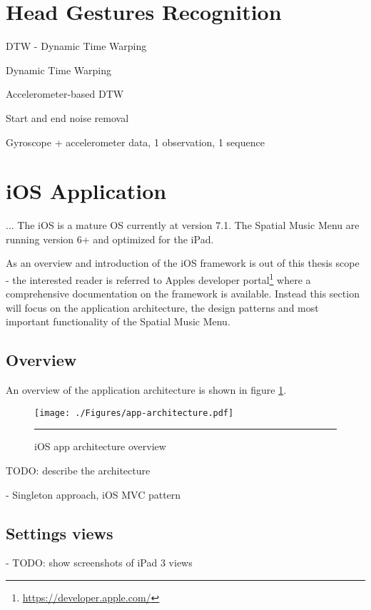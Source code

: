 \subsection{}


\section{Head Gestures Recognition}

DTW - Dynamic Time Warping 

Dynamic Time Warping \cite{salvador_toward_2007}

Accelerometer-based DTW \cite{akl_accelerometer-based_2010}

Start and end noise removal

Gyroscope + accelerometer data, 1 observation, 1 sequence


\section{iOS Application}
...
The iOS is a mature OS currently at version 7.1. The Spatial Music Menu are running version 6+ and optimized for the iPad.

As an overview and introduction of the iOS framework is out of this thesis scope - the interested reader is referred to Apples developer portal\footnote{\url{https://developer.apple.com/}} where a comprehensive documentation on the framework is available. Instead this section will focus on the application architecture, the design patterns and most important functionality of the Spatial Music Menu.

\subsection{Overview}
An overview of the application architecture is shown in figure \ref{fig:apparchitecture}.

\begin{figure}[htbp]
	\centering
		\texttt{[image: ./Figures/app-architecture.pdf]}
		\rule{35em}{1pt}
	\caption[App architecture]{iOS app architecture overview}
	\label{fig:apparchitecture}
\end{figure}

TODO: describe the architecture

- Singleton approach, iOS MVC pattern

\subsection{Settings views}
- TODO: show screenshots of iPad 3 views








